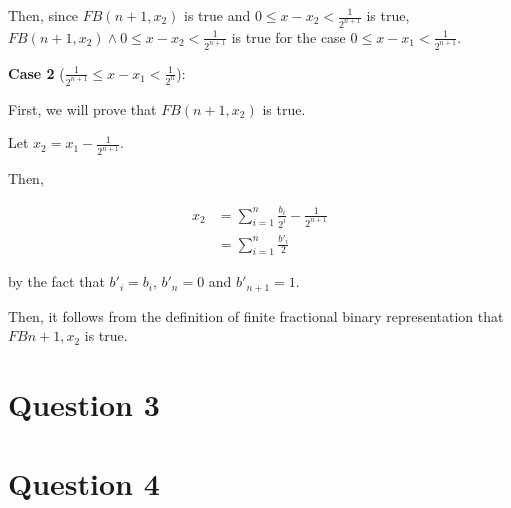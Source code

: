 \documentclass[12pt]{article}
\begin{document}
\begin{enumerate}[a.]
    \bigskip

    Then, since $FB(n+1, x_2)$ is true and $0 \leq x - x_2 < \frac{1}{2^{n+1}}$ is true,
    $FB(n+1, x_2) \land 0 \leq x - x_2 < \frac{1}{2^{n+1}}$ is true for the case
    $0 \leq x - x_1 < \frac{1}{2^{n+1}}$.

    \bigskip

    \textbf{Case 2} ($\frac{1}{2^{n+1}} \leq x - x_1 < \frac{1}{2^{n}}$):

    \bigskip

    First, we will prove that $FB(n+1,x_2)$ is true.

    \bigskip

    Let $x_2 = x_1 - \frac{1}{2^{n+1}}$.

    \bigskip

    Then,

    \begin{align}
        x_2 &= \sum\limits_{i=1}^n \frac{b_i}{2^i} - \frac{1}{2^{n+1}}\\
        &= \sum\limits_{i=1}^n \frac{b'_i}{2}
    \end{align}

    by the fact that $b'_i = b_i$, $b'_n = 0$ and $b'_{n+1} = 1$.

    \bigskip

    Then, it follows from the definition of finite fractional binary representation that
    $FB{n+1,x_2}$ is true.

\end{enumerate}

\section*{Question 3}

\section*{Question 4}
\end{document}

